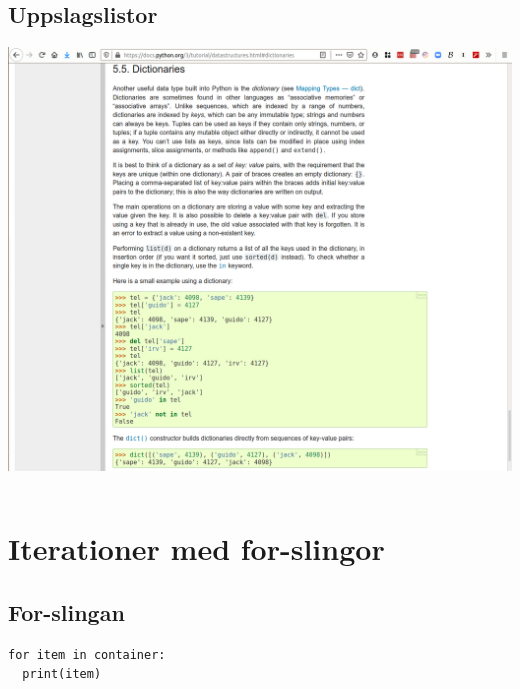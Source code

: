 \subsection{Uppslagslistor}

\begin{frame}
  \includegraphics[width=\columnwidth]{figs/docs-dicts.png}
\end{frame}

\begin{frame}[fragile]
  \begin{example}
    \inputminted{python}{examples/phone-small.py}
  \end{example}
\end{frame}


\section{Iterationer med for-slingor}

\subsection{For-slingan}

\begin{frame}[fragile]
  \begin{verbatim}
for item in container:
  print(item)
  \end{verbatim}
\end{frame}

